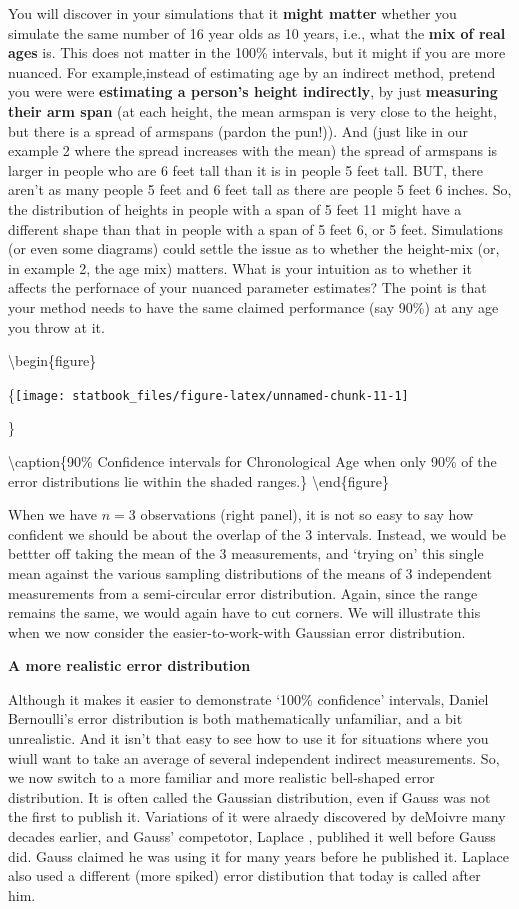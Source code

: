 \documentclass[]{book}
\begin{document}
You will discover in your simulations that it \textbf{might matter} whether you simulate the same number of 16 year olds as 10 years, i.e., what the \textbf{mix of real ages} is. This does not matter in the 100\% intervals, but it might if you are more nuanced. For example,instead of estimating age by an indirect method, pretend you were were \textbf{estimating a person's height indirectly}, by just \textbf{measuring their arm span} (at each height, the mean armspan is very close to the height, but there is a spread of armspans (pardon the pun!)). And (just like in our example 2 where the spread increases with the mean) the spread of armspans is larger in people who are 6 feet tall than it is in people 5 feet tall.
BUT, there aren't as many people 5 feet and 6 feet tall as there are people 5 feet 6 inches. So, the distribution of heights in people with a span of 5 feet 11 might have a different shape than that in people with a span of 5 feet 6, or 5 feet. Simulations (or even some diagrams) could settle the issue as to whether the height-mix (or, in example 2, the age mix) matters. What is your intuition as to whether it affects the perfornace of your nuanced parameter estimates? The point is that your method needs to have the same claimed performance (say 90\%) at any age you throw at it.

\textbackslash{}begin\{figure\}

\{\centering \texttt{[image: statbook\_files/figure-latex/unnamed-chunk-11-1]}

\}

\textbackslash{}caption\{90\% Confidence intervals for Chronological Age when only 90\% of the error distributions lie within the shaded ranges.\}\label{fig:unnamed-chunk-11}
\textbackslash{}end\{figure\}

When we have \(n = 3\) observations (right panel), it is not so easy to say how confident we should be about the overlap of the 3 intervals.
Instead, we would be bettter off taking the mean of the 3 measurements, and `trying on' this single mean against the various sampling distributions of the means of 3 independent measurements from a semi-circular error distribution. Again, since the range remains the same, we would again have to cut corners. We will illustrate this when we now consider the easier-to-work-with Gaussian error distribution.

\textbf{A more realistic error distribution}

Although it makes it easier to demonstrate `100\% confidence' intervals, Daniel Bernoulli's error distribution is both mathematically unfamiliar, and a bit unrealistic. And it isn't that easy to see how to use it for situations where you wiull want to take an average of several independent indirect measurements. So, we now switch to a more familiar and more realistic bell-shaped error distribution. It is often called the Gaussian distribution, even if Gauss was not the first to publish it. Variations of it were alraedy discovered by deMoivre many decades earlier, and Gauss' competotor, Laplace , publihed it well before Gauss did. Gauss claimed he was using it for many years before he published it.
Laplace also used a different (more spiked) error distibution that today is called after him.
\end{document}
